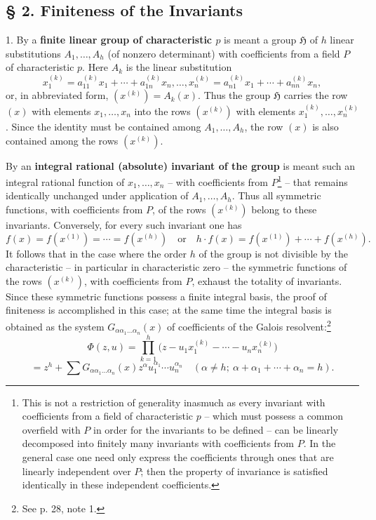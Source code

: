 \subsection*{§ 2. Finiteness of the Invariants}

1. By a \textbf{finite linear group of characteristic $p$} is meant a group $\mathfrak H$ of $h$ linear substitutions $A_1,\ldots,A_h$ (of nonzero determinant) with coefficients from a field $P$ of characteristic $p$. Here $A_k$ is the linear substitution
\[
 x_1^{(k)}=a_{11}^{(k)}x_1+\cdots+a_{1n}^{(k)}x_n,
 \ldots,
 x_n^{(k)}=a_{n1}^{(k)}x_1+\cdots+a_{nn}^{(k)}x_n,
\]
or, in abbreviated form, $(x^{(k)})=A_k(x)$. Thus the group $\mathfrak H$ carries the row $(x)$ with elements $x_1,
\ldots,x_n$ into the rows $(x^{(k)})$ with elements $x_1^{(k)},
\ldots,x_n^{(k)}$. Since the identity must be contained among $A_1,
\ldots,A_h$, the row $(x)$ is also contained among the rows $(x^{(k)})$.

By an \textbf{integral rational (absolute) invariant of the group} is meant such an integral rational function of $x_1,
\ldots,x_n$ -- with coefficients from $P$\footnote{This is not a restriction of generality inasmuch as every invariant with coefficients from a field of characteristic $p$ -- which must possess a common overfield with $P$ in order for the invariants to be defined -- can be linearly decomposed into finitely many invariants with coefficients from $P$. In the general case one need only express the coefficients through ones that are linearly independent over $P$; then the property of invariance is satisfied identically in these independent coefficients.} -- that remains identically unchanged under application of $A_1,
\ldots,A_h$. Thus all symmetric functions, with coefficients from $P$, of the rows $(x^{(k)})$ belong to these invariants. Conversely, for every such invariant one has
\[
 f(x)=f(x^{(1)})=\cdots=f(x^{(h)})
 \quad\text{or}\quad
 h\cdot f(x)=f(x^{(1)})+\cdots+f(x^{(h)}).
\]
It follows that in the case where the order $h$ of the group is not divisible by the characteristic -- in particular in characteristic zero -- the symmetric functions of the rows $(x^{(k)})$, with coefficients from $P$, exhaust the totality of invariants. Since these symmetric functions possess a finite integral basis, the proof of finiteness is accomplished in this case; at the same time the integral basis is obtained as the system $G_{\alpha\alpha_1\ldots\alpha_n}(x)$ of coefficients of the Galois resolvent:\footnote{See p. 28, note 1.}
\[
 \Phi(z,u)=\prod_{k=1}^{h}\bigl(z-u_1x_1^{(k)}-\cdots-u_nx_n^{(k)}\bigr)
\]
\[
 =z^h+\sum G_{\alpha\alpha_1\ldots\alpha_n}(x)
 z^{\alpha}u_1^{\alpha_1}\cdots u_n^{\alpha_n}
 \quad(\alpha\ne h;\ \alpha+\alpha_1+\cdots+\alpha_n=h).
\]


